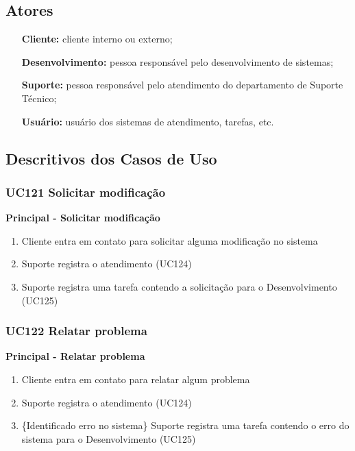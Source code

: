 \subsection{Atores}

\begin{itemize}

\item[\textbf{Cliente:}] cliente interno ou externo;
\item[\textbf{Desenvolvimento:}] pessoa responsável pelo desenvolvimento de sistemas;
\item[\textbf{Suporte:}] pessoa responsável pelo atendimento do departamento de Suporte Técnico;
\item[\textbf{Usuário:}] usuário dos sistemas de atendimento, tarefas, etc.
 
\end{itemize}

\subsection{Descritivos dos Casos de Uso}

\subsubsection{UC121 Solicitar modificação}

\textbf{Principal - Solicitar modificação}

\begin{enumerate}
\item Cliente entra em contato para solicitar alguma modificação no sistema
\item Suporte registra o atendimento (UC124)
\item Suporte registra uma tarefa contendo a solicitação para o Desenvolvimento (UC125)
\end{enumerate}

\subsubsection{UC122 Relatar problema}

\textbf{Principal - Relatar problema}

\begin{enumerate}
\item Cliente entra em contato para relatar algum problema
\item Suporte registra o atendimento (UC124)
\item \{Identificado erro no sistema\} Suporte registra uma tarefa contendo o erro do sistema para o Desenvolvimento (UC125)
\end{enumerate}

